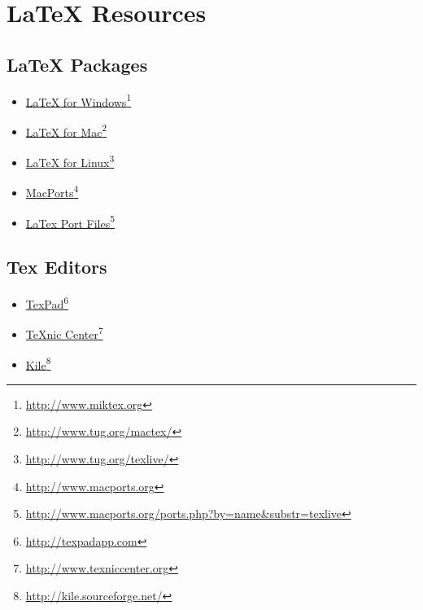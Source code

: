
\section{LaTeX Resources}

\subsection{LaTeX Packages}
\label{latexpackages}

\begin{itemize}
\item \href{http://www.miktex.org}{LaTeX for Windows}\footnote{\href{http://www.miktex.org}{http:/\slash www.miktex.org}}

\item \href{http://www.tug.org/mactex/}{LaTeX for Mac}\footnote{\href{http://www.tug.org/mactex/}{http:/\slash www.tug.org\slash mactex\slash }}

\item \href{http://www.tug.org/texlive/}{LaTeX for Linux}\footnote{\href{http://www.tug.org/texlive/}{http:/\slash www.tug.org\slash texlive\slash }}

\item \href{http://www.macports.org}{MacPorts}\footnote{\href{http://www.macports.org}{http:/\slash www.macports.org}}

\item \href{http://www.macports.org/ports.php?by=name&substr=texlive}{LaTex Port Files}\footnote{\href{http://www.macports.org/ports.php?by=name&substr=texlive}{http:/\slash www.macports.org\slash ports.php?by=name\&substr=texlive}}

\end{itemize}

\subsection{Tex Editors}
\label{texeditor}

\begin{itemize}
\item \href{http://texpadapp.com}{TexPad}\footnote{\href{http://texpadapp.com}{http:/\slash texpadapp.com}}

\item \href{http://www.texniccenter.org}{TeXnic Center}\footnote{\href{http://www.texniccenter.org}{http:/\slash www.texniccenter.org}}

\item \href{http://kile.sourceforge.net/}{Kile}\footnote{\href{http://kile.sourceforge.net/}{http:/\slash kile.sourceforge.net/}}

\end{itemize}

